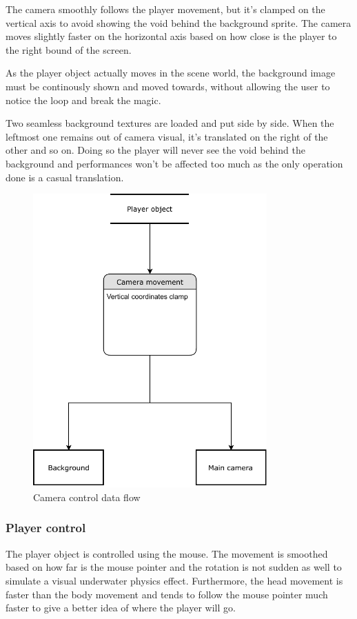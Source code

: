 \documentclass[11pt]{article}
\begin{document}
The camera smoothly follows the player movement, but it's clamped on the vertical axis to avoid showing the void behind the background sprite. The camera moves slightly faster on the horizontal axis based on how close is the player to the right bound of the screen.

As the player object actually moves in the scene world, the background image must be continously shown and moved towards, without allowing the user to notice the loop and break the magic.

Two seamless background textures are loaded and put side by side. When the leftmost one remains out of camera visual, it's translated on the right of the other and so on.
Doing so the player will never see the void behind the background and performances won't be affected too much as the only operation done is a casual translation.

\begin{figure}[H]
  \centering
  \includegraphics[width=0.8\textwidth]{figures/camera_controller}
  \caption{Camera control data flow}
\end{figure}

\subsubsection{Player control}
The player object is controlled using the mouse. The movement is smoothed based on how far is the mouse pointer and the rotation is not sudden as well to simulate a visual underwater physics effect. Furthermore, the head movement is faster than the body movement and tends to follow the mouse pointer much faster to give a better idea of where the player will go.
\end{document}
